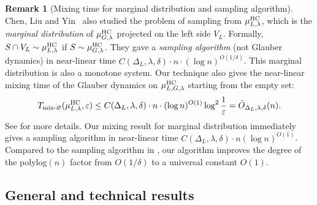 \documentclass[11pt,a4paper]{article}
\renewcommand{\epsilon}{\varepsilon}
\theoremstyle{definition}
\newtheorem{remark}[theorem]{Remark}
\renewcommand{\emptyset}{\varnothing}
\begin{document}
\begin{remark}[Mixing time for marginal distribution and sampling algorithm]
Chen, Liu and Yin~\cite{Chen0Y23} also studied the problem of sampling from $\mu^{\textnormal{HC}}_{L,\lambda}$, which is the \emph{marginal distribution} of $\mu^{\textnormal{HC}}_{G,\lambda}$ projected on the left side $V_L$. 
Formally, $S \cap V_L \sim \mu^{\textnormal{HC}}_{L,\lambda}$ if $S \sim \mu^{\textnormal{HC}}_{G,\lambda}$.
They gave a \emph{sampling algorithm} (not Glauber dynamics) in near-linear time $C(\Delta_L, \lambda, \delta) \cdot n \cdot (\log n)^{O(1/\delta)}$. 
This marginal distribution is also a monotone system.
Our technique also gives the near-linear mixing time of the Glauber dynamics on $\mu^{\textnormal{HC}}_{L, G,\lambda}$ starting from the empty set:
\[T_{\textnormal{mix-}\emptyset}(\mu_{L,\lambda}^{\textnormal{HC}},\epsilon)\leq C(\Delta_L, \lambda, \delta) \cdot n \cdot (\log n)^{O(1)} \log^2\frac{1}{\epsilon} = \tilde{O}_{\Delta_L,\lambda,\delta}(n).\]
See  for more details. 
Our mixing result for marginal distribution immediately gives a sampling algorithm in near-linear time $C(\Delta_L, \lambda, \delta) \cdot n (\log n)^{O(1)}$. Compared to the sampling algorithm in \cite{Chen0Y23}, our algorithm improves the degree of the polylog$(n)$ factor from $O(1/\delta)$ to a universal constant $O(1)$.
\end{remark}




\subsection{General and technical results}\label{sec:general-and-technical-results}
\end{document}
